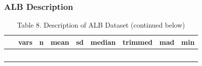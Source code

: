 \subsubsection{ALB Description}\label{alb-description}

\begin{Shaded}
\begin{Highlighting}[]
\NormalTok{(}\NormalTok{(ALB[,}\NormalTok{:}\NormalTok{]), } \NormalTok{)}
\end{Highlighting}
\end{Shaded}

\begin{longtable}[]{@{}ccccccccc@{}}
\caption{Table 8. Description of ALB Dataset (continued
below)}\tabularnewline
\toprule
\begin{minipage}[b]{0.13\columnwidth}\centering\strut
~\strut
\end{minipage} & \begin{minipage}[b]{0.07\columnwidth}\centering\strut
vars\strut
\end{minipage} & \begin{minipage}[b]{0.07\columnwidth}\centering\strut
n\strut
\end{minipage} & \begin{minipage}[b]{0.09\columnwidth}\centering\strut
mean\strut
\end{minipage} & \begin{minipage}[b]{0.09\columnwidth}\centering\strut
sd\strut
\end{minipage} & \begin{minipage}[b]{0.09\columnwidth}\centering\strut
median\strut
\end{minipage} & \begin{minipage}[b]{0.10\columnwidth}\centering\strut
trimmed\strut
\end{minipage} & \begin{minipage}[b]{0.09\columnwidth}\centering\strut
mad\strut
\end{minipage} & \begin{minipage}[b]{0.05\columnwidth}\centering\strut
min\strut
\end{minipage}\tabularnewline
\midrule
\endfirsthead
\toprule
\begin{minipage}[b]{0.13\columnwidth}\centering\strut
~\strut
\end{minipage} & \begin{minipage}[b]{0.07\columnwidth}\centering\strut

\end{minipage}
\end{longtable}
